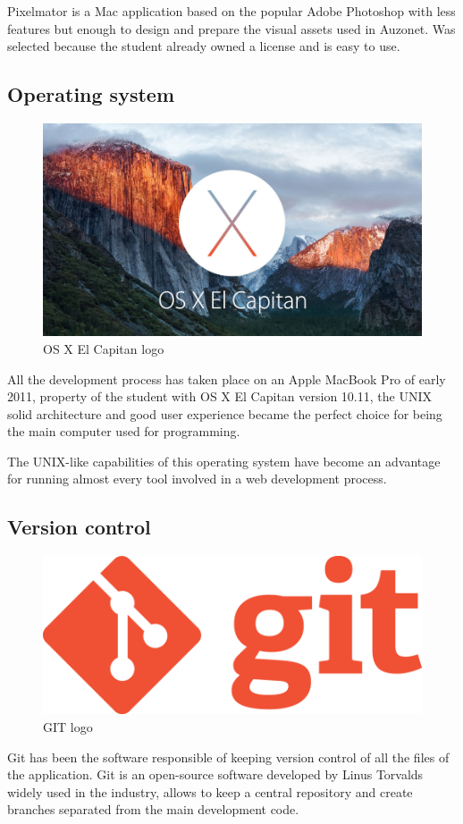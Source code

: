 \documentclass{DeustoFDP}
\begin{document}
Pixelmator is a Mac application based on the popular Adobe Photoshop with less features but enough to design and prepare the visual assets used in Auzonet. Was selected because the student already owned a license and is easy to use.

\subsection{Operating system}
\begin{figure}[h]
\centering
\includegraphics[width=0.7\linewidth]{fig/osxelcapitan}
\caption[OS X El Capitan logo]{OS X El Capitan logo}
\label{fig:osxelcapitan}
\end{figure}


All the development process has taken place on an Apple MacBook Pro of early 2011, property of the student with OS X El Capitan version 10.11, the UNIX solid architecture and good user experience became the perfect choice for being the main computer used for programming.

The UNIX-like capabilities of this operating system have become an advantage for running almost every tool involved in a web development process.
\subsection{Version control}
\begin{figure}[h]
\centering
\includegraphics[width=0.5\linewidth]{fig/git}
\caption[GIT logo]{GIT logo}
\label{fig:git}
\end{figure}

Git \cite{git} has been the software responsible of keeping version control of all the files of the application. Git is an open-source software developed by Linus Torvalds widely used in the industry, allows to keep a central repository and create branches separated from the main development code.
\end{document}
